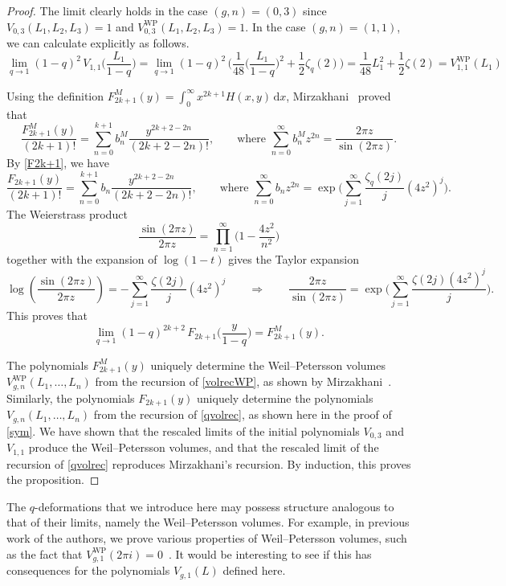 \documentclass[a4paper]{article}
\theoremstyle{plain}
\theoremstyle{definition}
\newcommand{\dd}{\mathrm{d}}
\begin{document}
\begin{proof}
The limit clearly holds in the case $(g,n) = (0,3)$ since $V_{0,3}(L_1,L_2,L_3) = 1$ and $V_{0,3}^{\mathrm{WP}}(L_1,L_2,L_3) = 1$. In the case $(g,n) = (1,1)$, we can calculate explicitly as follows.
\[
\lim_{q \to 1} (1-q)^2 \, V_{1,1} \Big( \frac{L_1}{1-q} \Big) = \lim_{q \to 1} (1-q)^2 \, \Big(\frac{1}{48}\Big(\frac{L_1}{1-q}\Big)^2+\frac{1}{2}\zeta_q(2) \Big) = \frac{1}{48}L_1^2+\frac{1}{2}\zeta(2)=V_{1,1}^{\mathrm{WP}}(L_1)
\]


Using the definition $F^M_{2k+1}(y)=\int_0^\infty \! x^{2k+1} H(x,y) \, \dd x$, Mirzakhani~\cite{MirSim} proved that
\[
\frac{F^M_{2k+1}(y)}{(2k+1)!}=\sum_{n=0}^{k+1}b^M_n \frac{y^{2k+2-2n}}{(2k+2-2n)!}, \qquad \text{where } \sum_{n=0}^\infty b^M_n z^{2n} = \frac{2\pi z}{\sin(2\pi z)}.
\]
By \cref{F2k+1}, we have
\[
\frac{F_{2k+1}(y)}{(2k+1)!}=\sum_{n=0}^{k+1} b_n\frac{y^{2k+2-2n}}{(2k+2-2n)!},\qquad \text{where } \sum_{n=0}^\infty b_n z^{2n} = \exp \bigg( \sum_{j=1}^\infty\frac{\zeta_q(2j)}{j} (4z^2)^j \bigg).
\]
The Weierstrass product
\[
\frac{\sin(2\pi z)}{2\pi z}=\prod_{n=1}^\infty \bigg( 1-\frac{4z^2}{n^2} \bigg)
\]
together with the expansion of $\log(1-t)$ gives the Taylor expansion
\[
\log\left(\frac{\sin(2\pi z)}{2\pi z}\right) = -\sum_{j=1}^\infty \frac{\zeta(2j)}{j} (4z^2)^{j} \qquad \Rightarrow \qquad \frac{2\pi z}{\sin(2\pi z)} = \exp \bigg(\sum_{j=1}^\infty \frac{\zeta(2j)(4z^2)^{j}}{j} \bigg).
\]
This proves that
\[
\lim_{q\to 1}(1-q)^{2k+2} \, F_{2k+1} \Big( \frac{y}{1-q} \Big) = F^M_{2k+1}(y).
\]


The polynomials $F^M_{2k+1}(y)$ uniquely determine the Weil--Petersson volumes $V^{\mathrm{WP}}_{g,n}(L_1, \ldots, L_n)$ from the recursion of \cref{volrecWP}, as shown by Mirzakhani~\cite{MirSim}. Similarly, the polynomials $F_{2k+1}(y)$ uniquely determine the polynomials $V_{g,n}(L_1, \ldots, L_n)$ from the recursion of \cref{qvolrec}, as shown here in the proof of \cref{sym}. We have shown that the rescaled limits of the initial polynomials $V_{0,3}$ and $V_{1,1}$ produce the Weil--Petersson volumes, and that the rescaled limit of the recursion of \cref{qvolrec} reproduces Mirzakhani's recursion. By induction, this proves the proposition.
\end{proof}


The $q$-deformations that we introduce here may possess structure analogous to that of their limits, namely the Weil--Petersson volumes. For example, in previous work of the authors, we prove various properties of Weil--Petersson volumes, such as the fact that $V_{g,1}^{\mathrm{WP}}(2\pi i)=0$~\cite{DNoWei}. It would be interesting to see if this has consequences for the polynomials $V_{g,1}(L)$ defined here.
\end{document}
